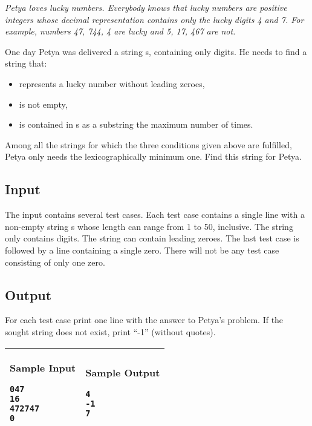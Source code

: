 \textit{Petya loves lucky numbers. Everybody knows that lucky numbers are positive
integers whose decimal representation contains only the lucky digits 4 and 7. For example,
numbers 47, 744, 4 are lucky and 5, 17, 467 are not.}

One day Petya was delivered a string s, containing only digits. He needs
to find a string that:
\begin{itemize}
\item represents a lucky number without leading zeroes,
\item is not empty,
\item is contained in s as a substring the maximum number of times.
\end{itemize}
Among all the strings for which the three conditions given above are
fulfilled, Petya only needs the lexicographically minimum one. Find this string
for Petya.

\subsection*{Input}

The input contains several test cases. Each test case contains a single line with a non-empty
string s whose length can range from 1 to 50, inclusive. The string only
contains digits. The string can contain leading zeroes.  The last test case is
followed by a line containing a single zero. There will not be any test case
consisting of only one zero.

\subsection*{Output}

For each test case print one line with the answer to Petya’s problem. If the
sought string does
not exist, print ``-1'' (without quotes).

\begin{table}[!h]
\centering
\begin{tabular}{|l|l|}
\hline
\begin{minipage}[t]{3in}
\textbf{Sample Input}
\begin{verbatim}
047
16
472747
0
\end{verbatim}
\vspace{1mm}
\end{minipage}
&

\begin{minipage}[t]{3in}
\textbf{Sample Output}
\begin{verbatim}
4
-1
7
\end{verbatim}
\vspace{1mm}
\end{minipage} \\
\hline
\end{tabular}
\end{table}

